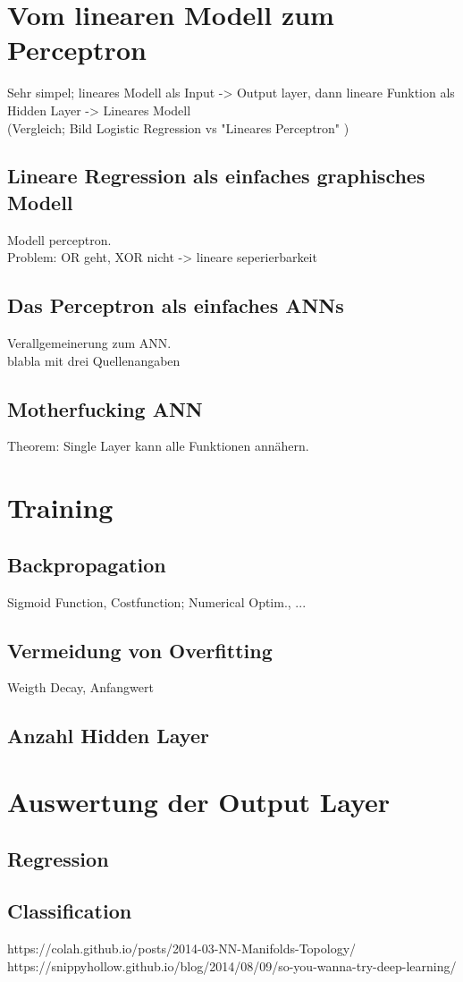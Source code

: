 
\section{Vom linearen Modell zum Perceptron}

Sehr simpel; lineares Modell als Input -> Output layer,
dann lineare Funktion als Hidden Layer -> Lineares Modell \\
(Vergleich; Bild Logistic Regression vs "Lineares Perceptron" )

\subsection{Lineare Regression als einfaches graphisches Modell}

Modell perceptron. \\Problem: OR geht, XOR nicht -> lineare seperierbarkeit

\subsection{Das Perceptron als einfaches ANNs}

Verallgemeinerung zum ANN. \\
blabla mit drei Quellenangaben\cite{ietf-ipfix-protocol,snoeren2001hash,belenky2003ip}

\subsection{Motherfucking ANN}
Theorem: Single Layer kann alle Funktionen annähern.

\section{Training} %

\subsection{Backpropagation}
Sigmoid Function, Costfunction; Numerical Optim., 
...
\subsection{Vermeidung von Overfitting}

Weigth Decay, Anfangwert

\subsection{Anzahl Hidden Layer}

\section{Auswertung der Output Layer}

\subsection{Regression}

\subsection{Classification}

https://colah.github.io/posts/2014-03-NN-Manifolds-Topology/
https://snippyhollow.github.io/blog/2014/08/09/so-you-wanna-try-deep-learning/
